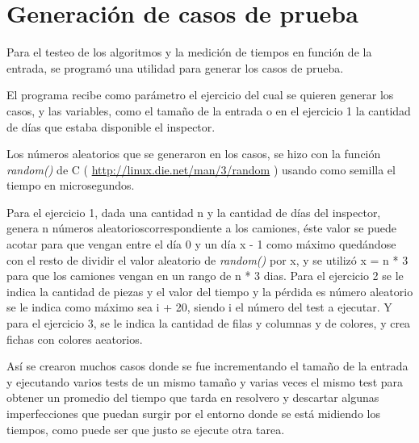 \documentclass[a4paper,11pt]{article}
\begin{document}

\fecha{\today}



\maketitle

\tableofcontents






\section{Generaci\'on de casos de prueba} \label{casos_de_prueba}
Para el testeo de los algoritmos y la medici\'on de tiempos en funci\'on de la entrada, se program\'o una utilidad para generar los casos de prueba.

El programa recibe como par\'ametro el ejercicio del cual se quieren generar los casos, y las variables, como el tama\~no de la entrada o en el ejercicio 1 la cantidad de d\'ias que estaba disponible el inspector.

Los n\'umeros aleatorios que se generaron en los casos, se hizo con la funci\'on \emph{random()} de C ( \href{http://linux.die.net/man/3/random}{http://linux.die.net/man/3/random} ) usando como semilla el tiempo en microsegundos.

Para el ejercicio 1, dada una cantidad n y la cantidad de d\'ias del inspector, genera n n\'umeros aleatorioscorrespondiente a los camiones, \'este valor se puede acotar para que vengan entre el d\'ia 0 y un d\'ia x - 1 como m\'aximo qued\'andose con el resto de dividir el valor aleatorio de \emph{random()} por x,
y se utiliz\'o x = n * 3 para que los camiones vengan en un rango de n * 3 dias. Para el ejercicio 2 se le indica la cantidad de piezas y el valor del tiempo y la p\'erdida es n\'umero aleatorio se le indica como m\'aximo sea i + 20, siendo i el n\'umero del test a ejecutar. Y para el ejercicio 3, se le indica la cantidad de filas y columnas y de colores, y crea fichas con colores aeatorios.

As\'i se crearon muchos casos donde se fue incrementando el tama\~no de la entrada y ejecutando varios tests de un mismo tama\~no y varias veces el mismo test para obtener un promedio del tiempo que tarda en resolvero y descartar algunas imperfecciones que puedan surgir por el entorno donde se est\'a midiendo los tiempos, como puede ser que justo se ejecute otra tarea.




\end{document}
